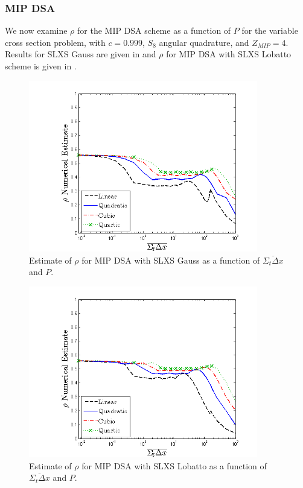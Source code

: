 \subsubsection{MIP DSA}

We now examine $\rho$ for the MIP DSA scheme as a function of $P$ for the variable cross section problem, with $c=0.999$, $S_8$ angular quadrature, and $Z_{MIP}=4$.  
Results for SLXS Gauss are given in  and $\rho$ for MIP DSA with SLXS Lobatto scheme is given in .
\begin{figure}[!hbp]
\centering
\includegraphics[width=10cm]{chapter4_acceleration/Const_2_Variable_XS_MIP_Gauss_spr.png}
\caption{Estimate of $\rho$ for MIP DSA with SLXS Gauss as a function of $\overline{\Sigma_t \Delta x}$ and $P$.}
\label{fig:varxs_mip_gauss}
\end{figure}
\begin{figure}[!htp]
\centering
\includegraphics[width=10cm]{chapter4_acceleration/Const_2_Variable_XS_MIP_Lobatto_spr.png}
\caption{Estimate of $\rho$ for MIP DSA with SLXS Lobatto as a function of $\overline{\Sigma_t \Delta x}$ and $P$.}
\label{fig:varxs_mip_lobatto}
\end{figure}
